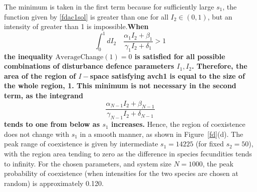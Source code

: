 The minimum is taken in the first term because for sufficiently large $s_1$, the function given by \eqref{fdac1sol} is greater than one for all $I_2 \in (0,1)$, but an intensity of greater than 1 is impossible.\textbf{When
\begin{equation}
\label{fdto:lbint}
\int_0^1 dI_2 \quad \frac{\alpha_1 I_2 +\beta_1}{\gamma_1 I_2+\delta_1} >1
\end{equation}
the inequality $\text{AverageChange}(1)=0$ is satisfied for all possible combinations of disturbance defence parameters $I_1,I_2$. Therefore, the area of the region of $I-$space satisfying {avch1} is equal to the size of the whole region, 1. This minimum is not necessary in the second term, as the integrand
$$
\frac{\alpha_{N-1} I_2 +\beta_{N-1}}{\gamma_{N-1} I_2+\delta_{N-1}}
$$
tends to one from below as $s_1$ increases.}
 Hence, the region of coexistence does not change with $s_1$ in a smooth manner, as shown in Figure~\ref{fd}(d). The peak range of coexistence is given by intermediate $s_1=14225$ (for fixed $s_2=50$), with the region area tending to zero as the difference in species fecundities tends to infinity. For the chosen parameters, and system size $N=1000$, the peak probability of coexistence (when intensities for the two species are chosen at random) is approximately 0.120.
